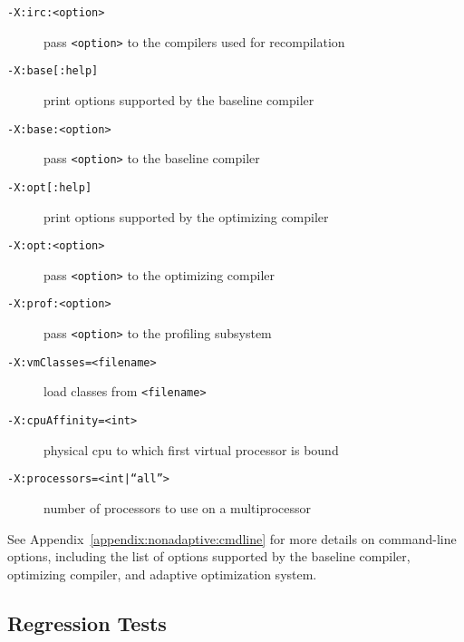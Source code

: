 \begin{description}
\item[{\tt -X:irc:<option>}]
pass {\tt <option>} to the compilers used for recompilation

\item[{\tt -X:base[:help]}]
print options supported by the baseline compiler

\item[{\tt -X:base:<option>}]
pass {\tt <option>} to the baseline compiler

\item[{\tt -X:opt[:help]}]
print options supported by the optimizing compiler

\item[{\tt -X:opt:<option>}]
pass {\tt <option>} to the optimizing compiler

\item[{\tt -X:prof:<option>}]
pass {\tt <option>} to the profiling subsystem

\item[{\tt -X:vmClasses=<filename>}]
load classes from {\tt <filename>}

\item[{\tt -X:cpuAffinity=<int>}]
physical cpu to which first virtual processor is bound

\item[{\tt -X:processors=<int|``all''>}]
number of processors to use on a multiprocessor

\end{description}

See Appendix~\ref{appendix:nonadaptive:cmdline} for more details on 
command-line options, including the list of options supported by the 
baseline compiler, optimizing compiler, and adaptive optimization system.

\JikesTMFooter

\JavaTMFooter

\subsection{Regression Tests}

